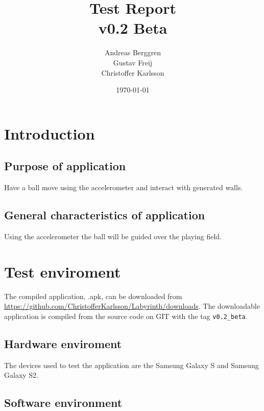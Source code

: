 \documentclass[a4paper,titlepage]{article}
\title{Test Report\\v0.2 Beta}
\author{Andreas Berggren\\
        Gustav Freij\\
        Christoffer Karlsson}
\date{\today}
\begin{document}
\maketitle

\tableofcontents
\newpage

% 
\setcounter{page}{1}


\section{Introduction}
\subsection{Purpose of application}
Have a ball move using the accelerometer and interact with generated walls.

\subsection{General characteristics of application}
Using the accelerometer the ball will be guided over the playing field.

\newpage
\section{Test enviroment}
The compiled application, .apk, can be downloaded from \url{https://github.com/ChristofferKarlsson/Labyrinth/downloads}. The downloadable application is
compiled from the source code on GIT with the tag \texttt{v0.2\_beta}.

\subsection{Hardware enviroment}
The devices used to test the application are the Samsung Galaxy S and Samsung
Galaxy S2.

\subsection{Software environment}
\end{document}
